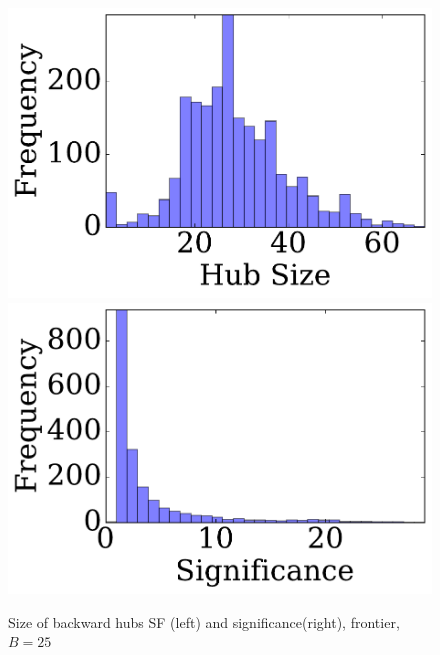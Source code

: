 \begin{figure} 
\begin{center}
\includegraphics[clip, trim = 0.1cm 0.3cm 0cm 0cm,scale=0.27]{TexImg/SF_bwd_hub_size.pdf}
\includegraphics[clip, trim = 1.3cm 0.3cm 0cm 0cm,scale=0.27]{TexImg/significance.pdf}
\end{center}
\caption{Size of backward hubs SF (left) and significance(right), frontier, $B=25$}\label{fig:SF_bwd_size}
\end{figure}


